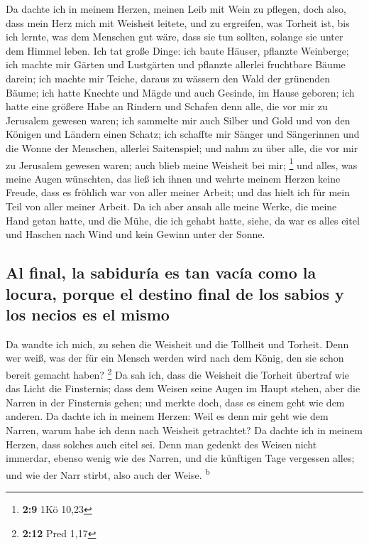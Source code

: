  Da dachte ich in meinem Herzen, meinen Leib mit Wein zu
pflegen, doch also, dass mein Herz mich mit Weisheit leitete, und zu
ergreifen, was Torheit ist, bis ich lernte, was dem Menschen gut wäre,
dass sie tun sollten, solange sie unter dem Himmel leben. 
Ich tat große Dinge: ich baute Häuser, pflanzte Weinberge;
 ich machte mir Gärten und Lustgärten und pflanzte
allerlei fruchtbare Bäume darein;  ich machte mir Teiche,
daraus zu wässern den Wald der grünenden Bäume;  ich hatte
Knechte und Mägde und auch Gesinde, im Hause geboren; ich hatte eine
größere Habe an Rindern und Schafen denn alle, die vor mir zu Jerusalem
gewesen waren;  ich sammelte mir auch Silber und Gold und
von den Königen und Ländern einen Schatz; ich schaffte mir Sänger und
Sängerinnen und die Wonne der Menschen, allerlei Saitenspiel;
 und nahm zu über alle, die vor mir zu Jerusalem gewesen
waren; auch blieb meine Weisheit bei mir; \footnote{\textbf{2:9} 1Kö
  10,23}  und alles, was meine Augen wünschten, das ließ
ich ihnen und wehrte meinem Herzen keine Freude, dass es fröhlich war
von aller meiner Arbeit; und das hielt ich für mein Teil von aller
meiner Arbeit.  Da ich aber ansah alle meine Werke, die
meine Hand getan hatte, und die Mühe, die ich gehabt hatte, siehe, da
war es alles eitel und Haschen nach Wind und kein Gewinn unter der
Sonne.

\hypertarget{al-final-la-sabiduruxeda-es-tan-vacuxeda-como-la-locura-porque-el-destino-final-de-los-sabios-y-los-necios-es-el-mismo}{%
\subsection{Al final, la sabiduría es tan vacía como la locura, porque
el destino final de los sabios y los necios es el
mismo}\label{al-final-la-sabiduruxeda-es-tan-vacuxeda-como-la-locura-porque-el-destino-final-de-los-sabios-y-los-necios-es-el-mismo}}

 Da wandte ich mich, zu sehen die Weisheit und die
Tollheit und Torheit. Denn wer weiß, was der für ein Mensch werden wird
nach dem König, den sie schon bereit gemacht haben? \footnote{\textbf{2:12}
  Pred 1,17}  Da sah ich, dass die Weisheit die Torheit
übertraf wie das Licht die Finsternis;  dass dem Weisen
seine Augen im Haupt stehen, aber die Narren in der Finsternis gehen;
und merkte doch, dass es einem geht wie dem anderen.  Da
dachte ich in meinem Herzen: Weil es denn mir geht wie dem Narren, warum
habe ich denn nach Weisheit getrachtet? Da dachte ich in meinem Herzen,
dass solches auch eitel sei.  Denn man gedenkt des Weisen
nicht immerdar, ebenso wenig wie des Narren, und die künftigen Tage
vergessen alles; und wie der Narr stirbt, also auch der Weise.
\textsuperscript{b}

